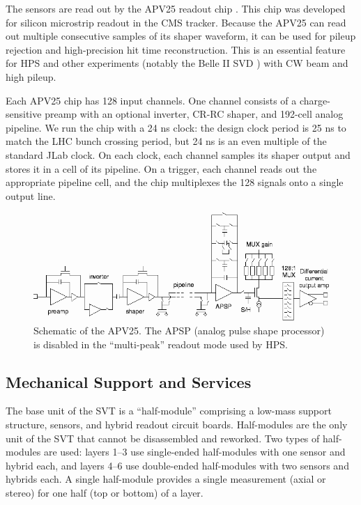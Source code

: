 The sensors are read out by the APV25 readout chip \cite{french_design_2001}.
This chip was developed for silicon microstrip readout in the CMS tracker.
Because the APV25 can read out multiple consecutive samples of its shaper waveform, it can be used for pileup rejection and high-precision hit time reconstruction.
This is an essential feature for HPS and other experiments (notably the Belle II SVD \cite{liu_belle_2012}) with CW beam and high pileup.

Each APV25 chip has 128 input channels.
One channel consists of a charge-sensitive preamp with an optional inverter, CR-RC shaper, and 192-cell analog pipeline.
We run the chip with a 24 ns clock: the design clock period is 25 ns to match the LHC bunch crossing period, but 24 ns is an even multiple of the standard JLab clock.
On each clock, each channel samples its shaper output and stores it in a cell of its pipeline.
On a trigger, each channel reads out the appropriate pipeline cell, and the chip multiplexes the 128 signals onto a single output line.


\begin{figure}[ht]
    \includegraphics[width=\textwidth]{detector/figs/apv25}
    \caption{Schematic of the APV25. The APSP (analog pulse shape processor) is disabled in the ``multi-peak'' readout mode used by HPS.}
    \label{fig:apv25}
\end{figure}


\subsection{Mechanical Support and Services}
The base unit of the SVT is a ``half-module'' comprising a low-mass support structure, sensors, and hybrid readout circuit boards.
Half-modules are the only unit of the SVT that cannot be disassembled and reworked.
Two types of half-modules are used: layers 1--3 use single-ended half-modules with one sensor and hybrid each, and layers 4--6 use double-ended half-modules with two sensors and hybrids each.
A single half-module provides a single measurement (axial or stereo) for one half (top or bottom) of a layer.


